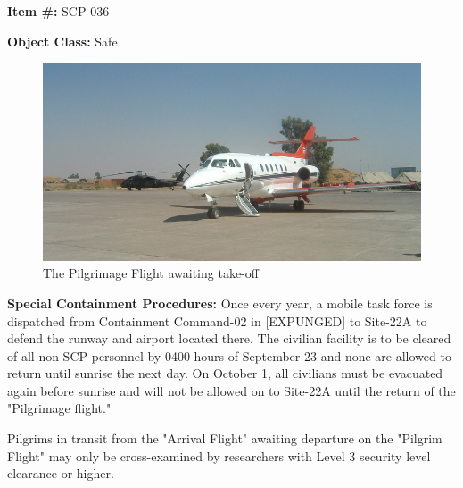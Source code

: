 
\textbf{Item \#:} SCP-036

\textbf{Object Class:} Safe

\begin{figure}[h]
\begin{center}
\includegraphics[scale=0.3]{scp/036a.jpg}
\linebreak The Pilgrimage Flight awaiting take-off
\end{center}
\end{figure}

\textbf{Special Containment Procedures:} Once every year, a mobile task force is dispatched from Containment Command-02 in [EXPUNGED] to Site-22A to defend the runway and airport located there. The civilian facility is to be cleared of all non-SCP personnel by 0400 hours of September 23 and none are allowed to return until sunrise the next day. On October 1, all civilians must be evacuated again before sunrise and will not be allowed on to Site-22A until the return of the "Pilgrimage flight."

Pilgrims in transit from the "Arrival Flight" awaiting departure on the "Pilgrim Flight" may only be cross-examined by researchers with Level 3 security level clearance or higher.

